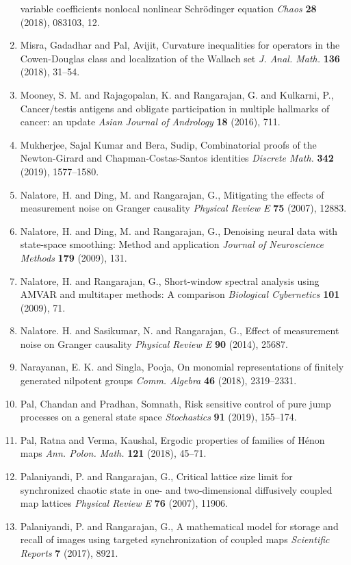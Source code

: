 \begin{enumerate}
variable coefficients nonlocal nonlinear {S}chr\"{o}dinger
equation {\em Chaos} {\bf 28} (2018), 083103, 12.
\item Misra, Gadadhar and Pal, Avijit, Curvature inequalities for operators in the {C}owen-{D}ouglas
class and localization of the {W}allach set {\em J. Anal. Math.} {\bf 136} (2018), 31--54.
\item Mooney, S. M. and Rajagopalan, K. and Rangarajan, G. and Kulkarni, P., Cancer/testis antigens and obligate participation in multiple hallmarks of cancer: an update {\em Asian Journal of Andrology} {\bf 18} (2016), 711.
\item Mukherjee, Sajal Kumar and Bera, Sudip, Combinatorial proofs of the {N}ewton-{G}irard and
{C}hapman-{C}ostas-{S}antos identities {\em Discrete Math.} {\bf 342} (2019), 1577--1580.
\item Nalatore, H. and Ding, M. and Rangarajan, G., Mitigating the effects of measurement noise on Granger causality {\em Physical Review E} {\bf 75} (2007), 12883.
\item Nalatore, H. and Ding, M. and Rangarajan, G., Denoising neural data with state-space smoothing: Method and application {\em Journal of Neuroscience Methods} {\bf 179} (2009), 131.
\item Nalatore, H. and Rangarajan, G., Short-window spectral analysis using AMVAR and multitaper methods: A comparison {\em Biological Cybernetics} {\bf 101} (2009), 71.
\item Nalatore. H. and Sasikumar, N. and Rangarajan, G., Effect of measurement noise on Granger causality {\em Physical Review E} {\bf 90} (2014), 25687.
\item Narayanan, E. K. and Singla, Pooja, On monomial representations of finitely generated nilpotent
groups {\em Comm. Algebra} {\bf 46} (2018), 2319--2331.
\item Pal, Chandan and Pradhan, Somnath, Risk sensitive control of pure jump processes on a general
state space {\em Stochastics} {\bf 91} (2019), 155--174.
\item Pal, Ratna and Verma, Kaushal, Ergodic properties of families of {H}\'{e}non maps {\em Ann. Polon. Math.} {\bf 121} (2018), 45--71.
\item Palaniyandi, P. and Rangarajan, G., Critical lattice size limit for synchronized chaotic state in one- and  two-dimensional diffusively coupled map lattices {\em Physical Review E} {\bf 76} (2007), 11906.
\item Palaniyandi, P. and Rangarajan, G., A mathematical model for storage and recall of images using targeted synchronization of coupled maps {\em Scientific Reports} {\bf 7} (2017), 8921.

\end{enumerate}
